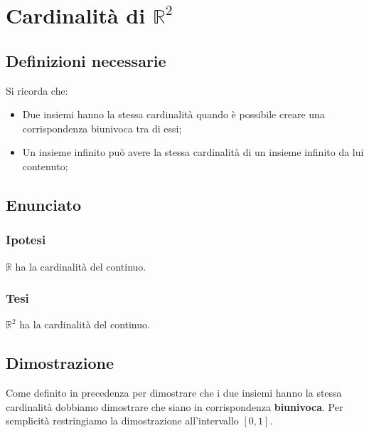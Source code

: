 \documentclass[../dimostrazioni]{subfiles}
\begin{document}
    \chapter{Cardinalità \texorpdfstring{di \(\mathbb{R}^2\)}{del continuo}}

        \section*{Definizioni necessarie}

            Si ricorda che:

            \begin{itemize}
                \item Due insiemi hanno la stessa cardinalità quando è possibile creare una corrispondenza biunivoca tra di essi;
                \item Un insieme infinito può avere la stessa cardinalità di un insieme infinito da lui contenuto;
            \end{itemize}

        \section*{Enunciato}

            \subsection*{Ipotesi}

            \( \mathbb{R} \) ha la cardinalità del continuo.

            \subsection*{Tesi}

            \( \mathbb{R}^2 \) ha la cardinalità del continuo.                

        \section*{Dimostrazione}

            Come definito in precedenza per dimostrare che i due insiemi hanno la stessa cardinalità 
            dobbiamo dimostrare che siano in corrispondenza \textbf{biunivoca}. 
            Per semplicità restringiamo la dimostrazione all'intervallo \([0, 1]\).
            
\end{document}
